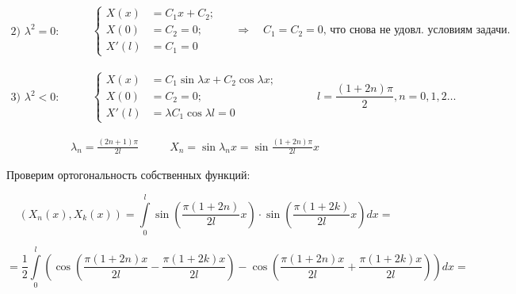 \begin{equation*}
  \begin{split}
    2)\,\,\lambda^{2} = 0:
  \end{split}
\quad\quad
  \begin{split}
    \begin{cases}
      X(x) & = C_{1}x + C_{2}; \\
      X(0) & = C_{2} = 0; \\
      X'(l) & = C_{1} = 0
    \end{cases}
  \end{split}
\quad\Rightarrow\quad
C_{1} = C_{2} = 0\text{, что снова не удовл. условиям задачи.}
\end{equation*}

\begin{equation*}
  \begin{split}
    3)\,\,\lambda^{2} < 0:
  \end{split}
\quad\quad
  \begin{split}
    \begin{cases}
      X(x) & = C_{1}\sin{\lambda x} + C_{2}\cos{\lambda x}; \\
      X(0) & = C_{2} = 0; \\
      X'(l) & = \lambda C_{1}\cos{\lambda l} = 0
    \end{cases}
  \end{split}
\quad\quad\quad
l=\frac{(1 + 2n)\pi}{2}, n=0,1,2\ldots
\end{equation*}

\makeatletter
\@fleqnfalse
\makeatother

\begin{equation*}
  \begin{split}
    \boxed{\lambda_{n} = \frac{(2n + 1)\pi}{2l}}
  \end{split}
\quad\quad
  \begin{split}
    \boxed{X_{n} = \sin{\lambda_{n}x} = \sin{\frac{(1 + 2n)\pi}{2l}x}}
  \end{split}
\quad\quad
\end{equation*}

Проверим ортогональность собственных функций:

$$ ( X_{n}(x), X_{k}(x) ) = \int\limits_0^l \sin \left( \frac{\pi(1 + 2n)}{2l}x \right) \cdot \sin \left( \frac{\pi(1 + 2k)}{2l}x \right)dx = $$

$$ = \frac{1}{2}\int\limits_0^l \left( \cos \left( \frac{\pi(1 + 2n)x}{2l} - \frac{\pi(1 + 2k)x}{2l} \right) - \cos \left( \frac{\pi(1 + 2n)x}{2l} + \frac{\pi(1 + 2k)x}{2l} \right) \right)dx = $$

